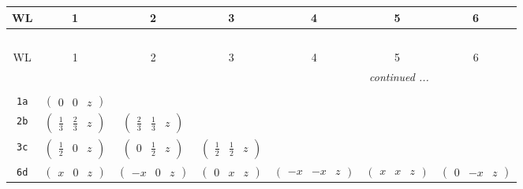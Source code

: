 \documentclass[fleqn,9pt,landscape]{jsarticle}
\begin{document}
\begin{center}
\renewcommand{\arraystretch}{1.2}
\begin{longtable}{ccccccc}
 \hline \hline
WL & 1 & 2 & 3 & 4 & 5 & 6 \\ \hline \endfirsthead

\multicolumn{6}{l}{\tablename\ \thetable{}} \\
 \hline \hline
WL & 1 & 2 & 3 & 4 & 5 & 6 \\ \hline \endhead

 \hline \hline
\multicolumn{6}{r}{\footnotesize\it continued ...} \\ \endfoot

 \hline \hline
\multicolumn{6}{r}{} \\ \endlastfoot

{\tt 1a} & $ \begin{pmatrix} 0 & 0 & z \end{pmatrix} $ & $  $ & $  $ & $  $ & $  $ & $  $ \\ \hline
{\tt 2b} & $ \begin{pmatrix} \frac{1}{3} & \frac{2}{3} & z \end{pmatrix} $ & $ \begin{pmatrix} \frac{2}{3} & \frac{1}{3} & z \end{pmatrix} $ & $  $ & $  $ & $  $ & $  $ \\ \hline
{\tt 3c} & $ \begin{pmatrix} \frac{1}{2} & 0 & z \end{pmatrix} $ & $ \begin{pmatrix} 0 & \frac{1}{2} & z \end{pmatrix} $ & $ \begin{pmatrix} \frac{1}{2} & \frac{1}{2} & z \end{pmatrix} $ & $  $ & $  $ & $  $ \\ \hline
{\tt 6d} & $ \begin{pmatrix} x & 0 & z \end{pmatrix} $ & $ \begin{pmatrix} - x & 0 & z \end{pmatrix} $ & $ \begin{pmatrix} 0 & x & z \end{pmatrix} $ & $ \begin{pmatrix} - x & - x & z \end{pmatrix} $ & $ \begin{pmatrix} x & x & z \end{pmatrix} $ & $ \begin{pmatrix} 0 & - x & z \end{pmatrix} $ \\ \hline

\end{longtable}
\end{center}
\end{document}
